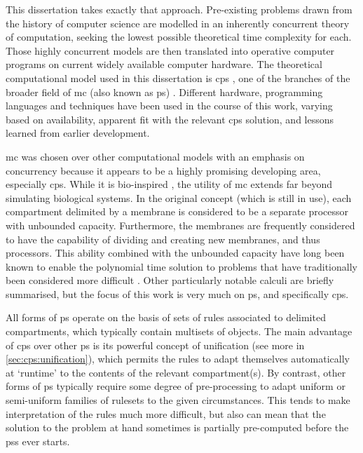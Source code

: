 This dissertation takes exactly that approach.  Pre-existing problems drawn from the history of computer science are modelled in an inherently concurrent theory of computation, seeking the lowest possible theoretical time complexity for each.  Those highly concurrent models are then translated into operative computer programs on current widely available computer hardware.  The theoretical computational model used in this dissertation is \gls{cps} \cite{Nicolescu2018}, one of the branches of the broader field of \gls{mc} (also known as \gls{ps}) \cite{Paun2010b,Paun2002}.  Different hardware, programming languages and techniques have been used in the course of this work, varying based on availability, apparent fit with the relevant \gls{cps} solution, and lessons learned from earlier development.

\Gls{mc} was chosen over other computational models with an emphasis on concurrency because it appears to be a highly promising developing area, especially \gls{cps}.  While it is bio-inspired \cite{Paun2000}, the utility of \gls{mc} extends far beyond simulating biological systems.  In the original concept (which is still in use), each \gls{compartment} delimited by a membrane is considered to be a separate processor with unbounded capacity.  Furthermore, the membranes are frequently considered to have the capability of dividing and creating new membranes, and thus processors.  This ability combined with the unbounded capacity have long been known to enable the polynomial time solution to problems that have traditionally been considered more difficult \cite{Paun1999a,Sosik2003}.
Other particularly notable calculi are briefly summarised, but the focus of this work is very much on \gls{ps}, and specifically \gls{cps}.

All forms of \gls{ps} operate on the basis of sets of rules associated to delimited \glspl{compartment}, which typically contain multisets of objects. The main advantage of \gls{cps} over other \gls{ps} is its powerful concept of unification (see more in \vref{sec:cps:unification}), which permits the rules to adapt themselves automatically at `runtime' to the contents of the relevant \gls{compartment}(s).  By contrast, other forms of \gls{ps} typically require some degree of pre-processing to adapt uniform or semi-uniform families of \glspl{ruleset} to the given circumstances.  This tends to make interpretation of the rules much more difficult, but also can mean that the solution to the problem at hand sometimes is partially pre-computed before the \glspl{ps} ever starts.

